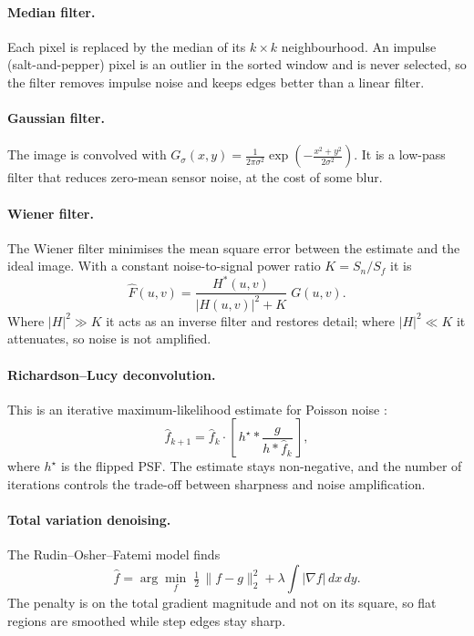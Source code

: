 \paragraph{Median filter.} Each pixel is replaced by the median of its $k\times k$ neighbourhood. An impulse (salt-and-pepper) pixel is an outlier in the sorted window and is never selected, so the filter removes impulse noise and keeps edges better than a linear filter.

\paragraph{Gaussian filter.} The image is convolved with $G_\sigma(x,y)=\frac{1}{2\pi\sigma^2}\exp\!\left(-\frac{x^2+y^2}{2\sigma^2}\right)$. It is a low-pass filter that reduces zero-mean sensor noise, at the cost of some blur.

\paragraph{Wiener filter.} The Wiener filter minimises the mean square error between the estimate and the ideal image. With a constant noise-to-signal power ratio $K = S_n/S_f$ it is
\begin{equation}
\hat{F}(u,v) = \frac{H^{*}(u,v)}{|H(u,v)|^{2} + K}\; G(u,v).
\label{eq:wiener}
\end{equation}
Where $|H|^2 \gg K$ it acts as an inverse filter and restores detail; where $|H|^2 \ll K$ it attenuates, so noise is not amplified.

\paragraph{Richardson--Lucy deconvolution.} This is an iterative maximum-likelihood estimate for Poisson noise \cite{richardson1972,lucy1974}:
\begin{equation}
\hat{f}_{k+1} = \hat{f}_k \cdot \left[\, h^{\star} * \frac{g}{h * \hat{f}_k} \,\right],
\end{equation}
where $h^{\star}$ is the flipped PSF. The estimate stays non-negative, and the number of iterations controls the trade-off between sharpness and noise amplification.

\paragraph{Total variation denoising.} The Rudin--Osher--Fatemi model \cite{rudin1992,chambolle2004} finds
\begin{equation}
\hat{f} = \arg\min_{f}\; \tfrac{1}{2}\,\lVert f - g\rVert_2^2 + \lambda \int \lvert\nabla f\rvert \, dx\,dy .
\end{equation}
The penalty is on the total gradient magnitude and not on its square, so flat regions are smoothed while step edges stay sharp.

